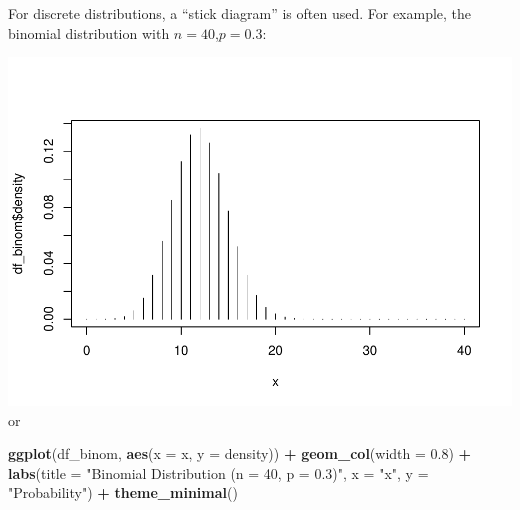 \documentclass[
]{article}
\newenvironment{Shaded}{\begin{snugshade}}{\end{snugshade}}
\newcommand{\AttributeTok}[1]{\textcolor[rgb]{0.13,0.29,0.53}{#1}}
\newcommand{\DecValTok}[1]{\textcolor[rgb]{0.00,0.00,0.81}{#1}}
\newcommand{\FloatTok}[1]{\textcolor[rgb]{0.00,0.00,0.81}{#1}}
\newcommand{\FunctionTok}[1]{\textcolor[rgb]{0.13,0.29,0.53}{\textbf{#1}}}
\newcommand{\NormalTok}[1]{#1}
\newcommand{\OtherTok}[1]{\textcolor[rgb]{0.56,0.35,0.01}{#1}}
\newcommand{\SpecialCharTok}[1]{\textcolor[rgb]{0.81,0.36,0.00}{\textbf{#1}}}
\newcommand{\StringTok}[1]{\textcolor[rgb]{0.31,0.60,0.02}{#1}}
\begin{document}
For discrete distributions, a ``stick diagram'' is often used. For
example, the binomial distribution with \(n = 40\),\(p=0.3\):

\begin{Shaded}
\end{Shaded}

\includegraphics{Probability-Distributions_files/figure-latex/unnamed-chunk-10-1.pdf}
or

\begin{Shaded}
\begin{Highlighting}[]
\FunctionTok{ggplot}\NormalTok{(df\_binom, }\FunctionTok{aes}\NormalTok{(}\AttributeTok{x =}\NormalTok{ x, }\AttributeTok{y =}\NormalTok{ density)) }\SpecialCharTok{+}
  \FunctionTok{geom\_col}\NormalTok{(}\AttributeTok{width =} \FloatTok{0.8}\NormalTok{) }\SpecialCharTok{+}
  \FunctionTok{labs}\NormalTok{(}\AttributeTok{title =} \StringTok{"Binomial Distribution (n = 40, p = 0.3)"}\NormalTok{,}
       \AttributeTok{x =} \StringTok{"x"}\NormalTok{, }\AttributeTok{y =} \StringTok{"Probability"}\NormalTok{) }\SpecialCharTok{+}
  \FunctionTok{theme\_minimal}\NormalTok{()}
\end{Highlighting}
\end{Shaded}
\end{document}
